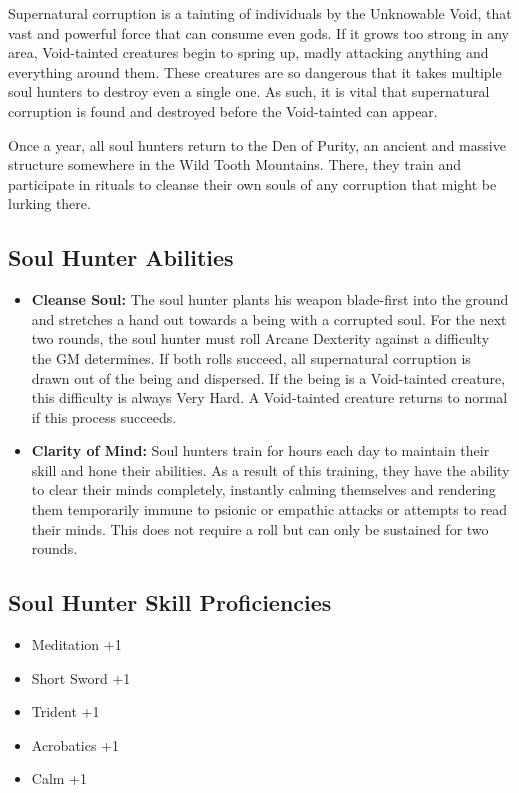 \begin{multicols}{2}
Supernatural corruption is a tainting of individuals by the Unknowable Void, 
that vast and powerful force that can consume even gods. If it grows too strong
in any area, Void-tainted creatures begin to spring up, madly attacking anything
and everything around them. These creatures are so dangerous that it takes
multiple soul hunters to destroy even a single one. As such, it is vital that
supernatural corruption is found and destroyed before the Void-tainted can appear.

Once a year, all soul hunters return to the Den of Purity, an ancient and massive
structure somewhere in the Wild Tooth Mountains. There, they train and
participate in rituals to cleanse their own souls of any corruption that might
be lurking there.

\subsection{Soul Hunter Abilities}

\begin{itemize}
    \item \textbf{Cleanse Soul:} The soul hunter plants his weapon blade-first into
    the ground and stretches a hand out towards a being with a corrupted soul. For
    the next two rounds, the soul hunter must roll Arcane Dexterity against a difficulty
    the GM determines. If both rolls succeed, all supernatural corruption is drawn
    out of the being and dispersed. If the being is a Void-tainted creature, this 
    difficulty is always Very Hard. A Void-tainted creature returns to normal if
    this process succeeds.
    \item \textbf{Clarity of Mind:} Soul hunters train for hours each day to maintain
    their skill and hone their abilities. As a result of this training, they have
    the ability to clear their minds completely, instantly calming themselves and rendering
    them temporarily immune to psionic or empathic attacks or attempts to read
    their minds. This does not require a roll but can only be sustained for two rounds.
\end{itemize}

\subsection{Soul Hunter Skill Proficiencies}

\begin{itemize}
    \item Meditation +1
    \item Short Sword +1
    \item Trident +1
    \item Acrobatics +1
    \item Calm +1
\end{itemize}


\end{multicols}
